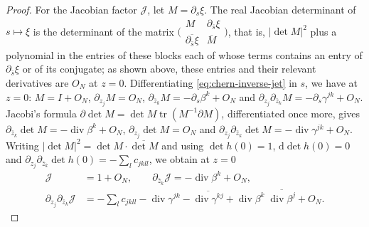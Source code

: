 \begin{proof}
For the Jacobian factor $\mathcal J$, let $M=\partial_s\xi$. The real Jacobian determinant of $s\mapsto\xi$ is the determinant of the matrix $\bigl(\begin{smallmatrix}M&\partial_{\bar s}\xi\\\overline{\partial_{\bar s}\xi}&\overline M\end{smallmatrix}\bigr)$, that is, $|\det M|^2$ plus a polynomial in the entries of these blocks each of whose terms contains an entry of $\partial_{\bar s}\xi$ or of its conjugate; as shown above, these entries and their relevant derivatives are $O_N$ at $z=0$. Differentiating \eqref{eq:chern-inverse-jet} in $s$, we have at $z=0$: $M=I+O_N$, $\partial_{z_j}M=O_N$, $\partial_{\bar z_k}M=-\partial_s\beta^k+O_N$ and $\partial_{z_j}\partial_{\bar z_k}M=-\partial_s\gamma^{jk}+O_N$. Jacobi's formula $\partial\det M=\det M\operatorname{tr}(M^{-1}\partial M)$, differentiated once more, gives $\partial_{\bar z_k}\det M=-\operatorname{div}\beta^k+O_N$, $\partial_{z_j}\det M=O_N$ and $\partial_{z_j}\partial_{\bar z_k}\det M=-\operatorname{div}\gamma^{jk}+O_N$. Writing $|\det M|^2=\det M\cdot\overline{\det M}$ and using $\det h(0)=1$, $\mathrm d\det h(0)=0$ and $\partial_{z_j}\partial_{\bar z_k}\det h(0)=-\sum_lc_{jkll}$, we obtain at $z=0$
\begin{align*}
 \mathcal J&=1+O_N,\qquad \partial_{\bar z_k}\mathcal J=-\operatorname{div}\beta^k+O_N,\\
 \partial_{z_j}\partial_{\bar z_k}\mathcal J&=-\sum_lc_{jkll}-\operatorname{div}\gamma^{jk}-\overline{\operatorname{div}\gamma^{kj}}+\operatorname{div}\beta^k\;\overline{\operatorname{div}\beta^j}+O_N.
\end{align*}


\end{proof}
